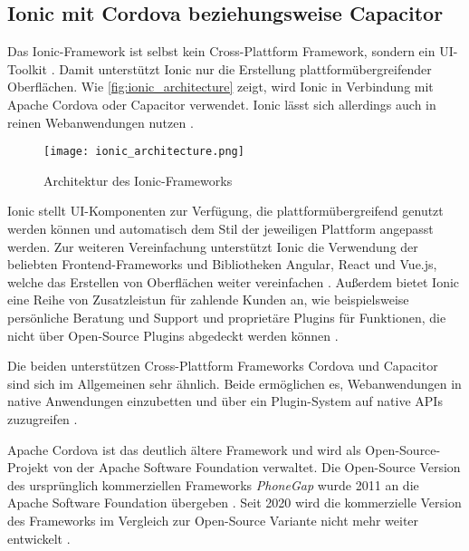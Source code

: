 \subsection{Ionic mit Cordova beziehungsweise Capacitor}
\label{sec:frameworks_ionic}

Das Ionic-Framework ist selbst kein Cross-Plattform Framework, sondern ein UI-Toolkit \cite{Ionic_Docs}.
Damit unterstützt Ionic nur die Erstellung plattformübergreifender Oberflächen.
Wie \autoref{fig:ionic_architecture} zeigt, wird Ionic in Verbindung mit Apache Cordova oder Capacitor verwendet.
Ionic lässt sich allerdings auch in reinen Webanwendungen nutzen \cite{Ionic_Docs}.
\begin{figure}[h]
    \centering
    \texttt{[image: ionic\_architecture.png]}
    \caption{Architektur des Ionic-Frameworks \cite{Ionic_Architektur}}
    \label{fig:ionic_architecture}
\end{figure}


Ionic stellt \ac{UI}-Komponenten zur Verfügung, die plattformübergreifend genutzt werden können und automatisch dem Stil der jeweiligen Plattform angepasst werden.
Zur weiteren Vereinfachung unterstützt Ionic die Verwendung der beliebten Frontend-Frameworks und Bibliotheken Angular, React und Vue.js, welche das Erstellen von Oberflächen weiter vereinfachen \cite{Ionic_Docs, Ionic_EvaluationGuide}.
Außerdem bietet Ionic eine Reihe von Zusatzleistun für zahlende Kunden an, wie beispielsweise persönliche Beratung und Support und proprietäre Plugins für Funktionen, die nicht über Open-Source Plugins abgedeckt werden können \cite{Ionic_EvaluationGuide}.



Die beiden unterstützen Cross-Plattform Frameworks Cordova und Capacitor sind sich im Allgemeinen sehr ähnlich.
Beide ermöglichen es, Webanwendungen in native Anwendungen einzubetten und über ein Plugin-System auf native \acp{API} zuzugreifen \cite{Ionic_Cordova_vs_Capacitor}.


Apache Cordova ist das deutlich ältere Framework und wird als Open-Source-Projekt von der Apache Software Foundation verwaltet.
Die Open-Source Version des ursprünglich kommerziellen Frameworks \textit{PhoneGap} wurde 2011 an die Apache Software Foundation übergeben \cite{Steyer_Cordova}.
Seit 2020 wird die kommerzielle Version des Frameworks im Vergleich zur Open-Source Variante nicht mehr weiter entwickelt \cite{Adobe_PhoneGap_EOL}.


